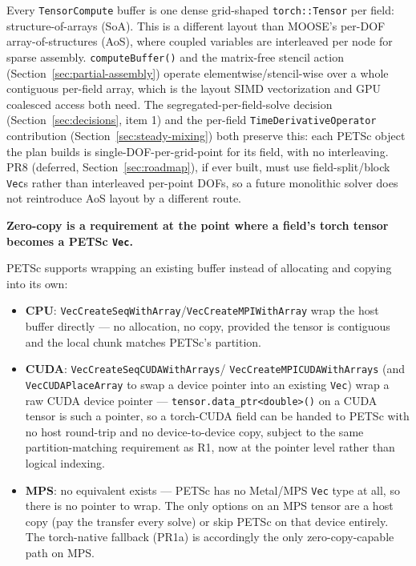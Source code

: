 \documentclass[11pt]{article}
\begin{document}
Every \texttt{TensorCompute} buffer is one dense grid-shaped
\texttt{torch::Tensor} per field: structure-of-arrays (SoA). This is a
different layout than MOOSE's per-DOF array-of-structures (AoS), where
coupled variables are interleaved per node for sparse assembly.
\texttt{computeBuffer()} and the
matrix-free stencil action (Section~\ref{sec:partial-assembly}) operate
elementwise/stencil-wise over a whole contiguous per-field array, which is
the layout SIMD vectorization and GPU coalesced access both need. The
segregated-per-field-solve decision (Section~\ref{sec:decisions}, item 1)
and the per-field \texttt{TimeDerivativeOperator} contribution
(Section~\ref{sec:steady-mixing}) both preserve this: each PETSc object the
plan builds is single-DOF-per-grid-point for its field, with no
interleaving. PR8 (deferred, Section~\ref{sec:roadmap}), if ever built,
must use field-split/block \texttt{Vec}s rather than interleaved per-point
DOFs, so a future monolithic solver does not reintroduce AoS layout by a
different route.

\begin{tcolorbox}[colback=lightgray, colframe=marlinblue, boxrule=0.6pt, arc=1mm]
\textbf{Zero-copy is a requirement at the point where a field's torch
tensor becomes a PETSc \texttt{Vec}.}
\end{tcolorbox}

PETSc supports wrapping an existing buffer instead of allocating and copying
into its own:
\begin{itemize}
\item \textbf{CPU}: \texttt{VecCreateSeqWithArray}/\texttt{VecCreateMPIWithArray}
  wrap the host buffer directly --- no allocation, no copy, provided the
  tensor is contiguous and the local chunk matches PETSc's partition.
\item \textbf{CUDA}: \texttt{VecCreateSeqCUDAWithArrays}/
  \texttt{VecCreateMPICUDAWithArrays} (and \texttt{VecCUDAPlaceArray} to
  swap a device pointer into an existing \texttt{Vec}) wrap a raw CUDA
  device pointer --- \texttt{tensor.data\_ptr<double>()} on a CUDA tensor is
  such a pointer, so a torch-CUDA field can be handed to PETSc with no host
  round-trip and no device-to-device copy, subject to the same
  partition-matching requirement as R1, now at the pointer level rather
  than logical indexing.
\item \textbf{MPS}: no equivalent exists --- PETSc has no Metal/MPS
  \texttt{Vec} type at all, so there is no pointer to wrap. The only options
  on an MPS tensor are a host copy (pay the transfer every solve) or skip
  PETSc on that device entirely. The torch-native fallback (PR1a) is
  accordingly the only zero-copy-capable path on MPS.
\end{itemize}
\end{document}
